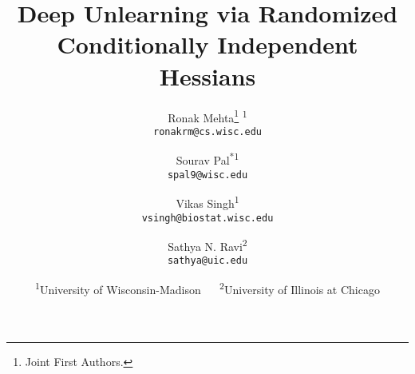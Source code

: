 \documentclass[10pt,twocolumn,letterpaper]{article}
\begin{document}
\title{Deep Unlearning via Randomized Conditionally Independent Hessians}

\author{Ronak Mehta\thanks{Joint First Authors.} \textsuperscript{\rm 1}\\
{\tt\small ronakrm@cs.wisc.edu}
\and
Sourav Pal\textsuperscript{*\rm 1}\\
{\tt\small spal9@wisc.edu}
\and
Vikas Singh\textsuperscript{\rm 1} \\
{\tt\small vsingh@biostat.wisc.edu}
\and
Sathya N. Ravi\textsuperscript{\rm 2} \\
{\tt\small sathya@uic.edu}
\and
{\textsuperscript{\rm 1}University of Wisconsin-Madison $\quad$
\textsuperscript{\rm 2}University of Illinois at Chicago}
}

\maketitle


\begin{abstract}

\end{abstract}













{\small


}
\end{document}
